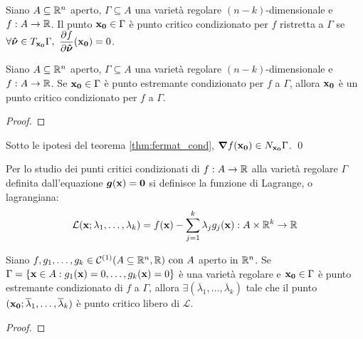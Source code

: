 \begin{definition}
    Siano $A\subseteq\mathbb{R}^n$ aperto, $\Gamma \subseteq A$ una varietà regolare $(n-k)$-dimensionale e $f: A\to\mathbb{R}$. Il punto $\vb{x_0} \in \Gamma$ è punto critico condizionato per $f$ ristretta a $\Gamma$ se $\forall \bm{\hat{\nu}} \in T_{\vb{x_0}}\Gamma, \ \displaystyle\frac{\partial f}{\partial \bm{\hat{\nu}}}(\vb{x_0})=0$. 
\end{definition}

\begin{theorem}
    \label{thm:fermat_cond}
    Siano $A\subseteq\mathbb{R}^n$ aperto, $\Gamma \subseteq A$ una varietà regolare $(n-k)$-dimensionale e $f: A\to\mathbb{R}$. Se $\vb{x_0} \in \Gamma$ è punto estremante condizionato per $f$ a $\Gamma$, allora $\vb{x_0}$ è un punto critico condizionato per $f$ a $\Gamma$.
\end{theorem}

\begin{proof}
\end{proof}

\begin{corollary}
    Sotto le ipotesi del teorema \ref{thm:fermat_cond}, $\grad f (\vb{x_0}) \in N_{\vb{x_0}}\Gamma$.
    \qed
\end{corollary}

\begin{definition}
    Per lo studio dei punti critici condizionati di $f: A\to \mathbb{R}$ alla varietà regolare $\Gamma$ definita dall'equazione $\bm g (\vb{x})=\vb{0}$ si definisce la funzione di Lagrange, o lagrangiana:
    $$
        \displaystyle \mathcal{L}(\vb{x};\lambda_1,\dots,\lambda_k)=f(\vb{x})-\sum_{j=1}^k \lambda_j g_j(\vb{x}) : A \times \mathbb{R}^k \to \mathbb{R}
    $$
\end{definition}

\begin{theorem}
    Siano $f,g_1,\dots,g_k \in \mathcal{C}^{(1)}(A\subseteq\mathbb{R}^n, \mathbb{R}) \text{ con } A$ aperto in $\mathbb{R}^n$. Se $\Gamma = \{ \vb{x} \in A: g_1 (\vb{x})=0, \dots, g_k(\vb{x})=0 \}$ è una varietà regolare e $\vb{x_0} \in \Gamma$ è punto estremante condizionato di $f$ a $\Gamma$, allora $\exists (\overline{\lambda}_1, \dots,\overline{\lambda}_k)$ tale che il punto $(\vb{x_0}; \overline{\lambda}_1,\dots,\overline{\lambda}_k)$ è punto critico libero di $\mathcal{L}$.
\end{theorem}

\begin{proof}
\end{proof}

